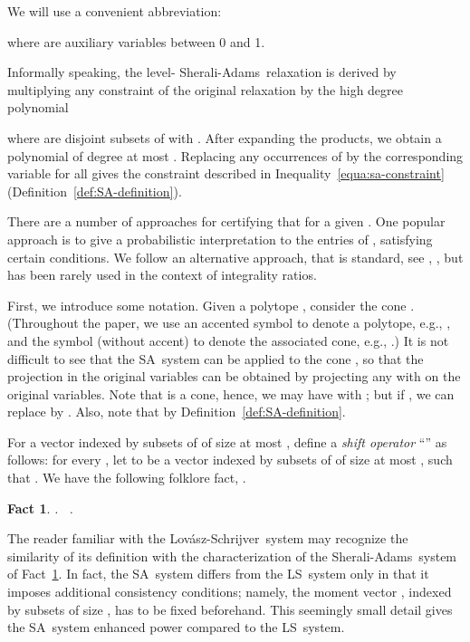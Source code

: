 \documentclass[11pt]{article}
\newtheorem{fact}[theorem]{Fact}
\newcommand{\sa}{\textsf{Sherali-Adams}}
\newcommand{\ls}{\textsf{Lov\'asz-Schrijver}}
\newcommand{\iLS}{\textsf{LS}}
\newcommand{\iSA}{\textsf{SA}}
\begin{document}
We will use a convenient abbreviation:
  
where  are auxiliary variables between 0 and 1. 

Informally speaking, the level- \sa\ relaxation is derived by
multiplying any constraint of the original relaxation by the high
degree polynomial 

where
 are disjoint subsets of  with .
After expanding the products, we obtain a polynomial of degree at most
. Replacing any occurrences of  by the
corresponding variable  for all  gives
the constraint described in Inequality~\eqref{equa:sa-constraint}
(Definition~\ref{def:SA-definition}).


There are a number of approaches for certifying that  for a given . One popular approach is to give a
probabilistic interpretation to the entries of , satisfying
certain conditions. We follow an alternative approach, that is
standard, see \cite{Lau03}, \cite[Lemma~2.9]{tourlakisthesis06},
but has been rarely used in the context of integrality ratios.

First, we introduce some notation.
Given a polytope ,
consider the cone
.
(Throughout the paper, we use an accented symbol to denote a polytope,
e.g., , and
the symbol (without accent) to denote the associated cone, e.g., .)
It is not difficult to see
that the \iSA\ system can be applied to the cone , so that
the projection in the  original variables
can be obtained by projecting
any  with 
on the  original variables.
Note that  is a cone, hence,
we may have  with ;
but if ,
we can replace  by .
Also, note that  by Definition~\ref{def:SA-definition}.

For a vector  indexed by subsets of  of size at
most , define a \textit{shift operator} ``'' as follows:
for every , let  to be a vector indexed by
subsets of  of size at most , such that .
We have the following folklore fact, \cite[Lemma~2.9]{tourlakisthesis06}.

\begin{fact}.~ \label{fact:recursive-SA}
.
\end{fact}


The reader familiar with the \ls\ system may recognize the similarity
of its definition with the characterization of the \sa\ system of
Fact~\ref{fact:recursive-SA}. In fact, the \iSA\ system differs from
the \iLS\ system only in that it imposes additional consistency
conditions; namely, the moment vector , indexed by subsets of size
, has to be fixed beforehand.
This seemingly small detail gives the \iSA\ system enhanced power
compared to the \iLS\ system.
\end{document}
